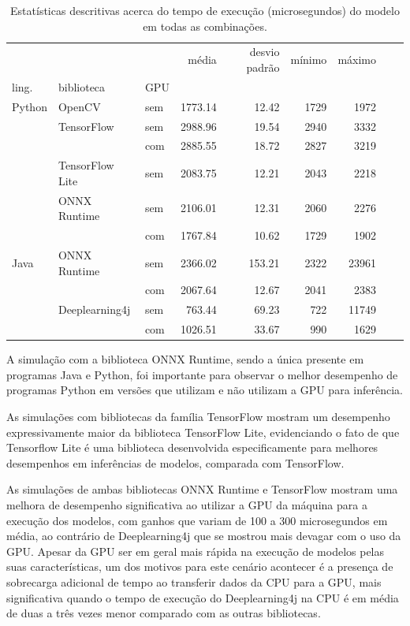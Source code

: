 \begin{table}
  \centering
  \begin{tabular}{lllrrrrrr}
    \toprule
           &                 &     & média   & desvio padrão & mínimo & máximo \\
    ling.  & biblioteca      & GPU &         &               &        &        \\
    \midrule
    Python & OpenCV          & sem & 1773.14 & 12.42         & 1729   & 1972   \\
           & TensorFlow      & sem & 2988.96 & 19.54         & 2940   & 3332   \\
           &                 & com & 2885.55 & 18.72         & 2827   & 3219   \\
           & TensorFlow Lite & sem & 2083.75 & 12.21         & 2043   & 2218   \\
           & ONNX Runtime    & sem & 2106.01 & 12.31         & 2060   & 2276   \\
           &                 & com & 1767.84 & 10.62         & 1729   & 1902   \\
    Java   & ONNX Runtime    & sem & 2366.02 & 153.21        & 2322   & 23961  \\
           &                 & com & 2067.64 & 12.67         & 2041   & 2383   \\
           & Deeplearning4j  & sem & 763.44  & 69.23         & 722    & 11749  \\
           &                 & com & 1026.51 & 33.67         & 990    & 1629   \\

    \bottomrule
  \end{tabular}
  \caption{Estatísticas descritivas acerca do tempo de execução (microsegundos) do modelo em todas as combinações.}
  \label{tab:all}
\end{table}

A simulação com a biblioteca ONNX Runtime, sendo a única presente em programas Java e Python, foi importante para observar o melhor desempenho de programas Python em versões que utilizam e não utilizam a GPU para inferência.

As simulações com bibliotecas da família TensorFlow mostram um desempenho expressivamente maior da biblioteca TensorFlow Lite, evidenciando o fato de que Tensorflow Lite é uma biblioteca desenvolvida especificamente para melhores desempenhos em inferências de modelos, comparada com TensorFlow.

As simulações de ambas bibliotecas ONNX Runtime e TensorFlow mostram uma melhora de desempenho significativa ao utilizar a GPU da máquina para a execução dos modelos, com ganhos que variam de 100 a 300 microsegundos em média, ao contrário de Deeplearning4j que se mostrou mais devagar com o uso da GPU. Apesar da GPU ser em geral mais rápida na execução de modelos pelas suas características, um dos motivos para este cenário acontecer é a presença de sobrecarga adicional de tempo ao transferir dados da CPU para a GPU, mais significativa quando o tempo de execução do Deeplearning4j na CPU é em média de duas a três vezes menor comparado com as outras bibliotecas.

